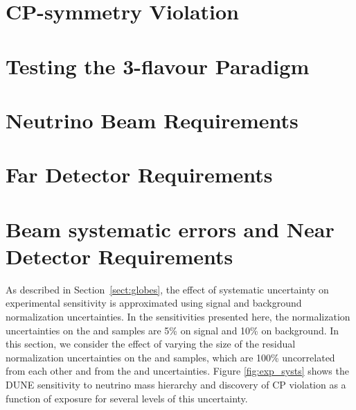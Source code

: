 \section{CP-symmetry Violation}
\label{sec:physics-lbnosc-cpv}

\section{Testing the 3-flavour Paradigm}
\label{sec:physics-lbnosc-3nutests}

\section{Neutrino Beam Requirements}
\label{sec:physics-lbnosc-beam-req}

\section{Far Detector Requirements}
\label{sec:physics-lbnosc-fd-req}

\section{Beam systematic errors and Near Detector Requirements}
\label{sec:physics-lbnosc-beamnd-req}

As described in Section~\ref{sect:globes}, the effect of systematic uncertainty on
experimental sensitivity is approximated using signal and background
normalization uncertainties. In the sensitivities presented here, the
normalization uncertainties on the \numu and \anumu samples are 5\%
on signal and 10\% on background. In this section, we consider the effect of
varying the size of the residual normalization uncertainties
on the \nue and \anue samples, which are 100\% uncorrelated from each other and from the
\numu and \anumu uncertainties.
Figure \ref{fig:exp_systs} shows the
DUNE sensitivity to neutrino mass hierarchy and discovery of CP violation
as a function of exposure for several levels of this uncertainty.

